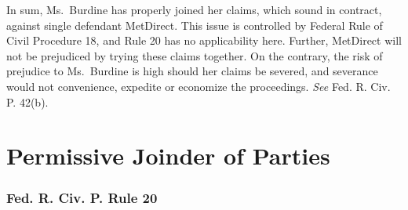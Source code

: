 \documentclass[11pt,letterpaper,twoside]{article}
\begin{document}
In sum, Ms.~Burdine has properly joined her claims, which sound in
contract, against single defendant MetDirect. This issue is controlled
by Federal Rule of Civil Procedure 18, and Rule 20 has no applicability
here. Further, MetDirect will not be prejudiced by trying these claims
together. On the contrary, the risk of prejudice to Ms.~Burdine is high
should her claims be severed, and severance would not convenience,
expedite or economize the proceedings. \emph{See} Fed. R. Civ. P. 42(b).

\section{Permissive Joinder of
Parties}\label{permissive-joinder-of-parties}

\subsubsection{Fed. R. Civ. P. Rule 20}\label{fedciv_rule20}
\end{document}
